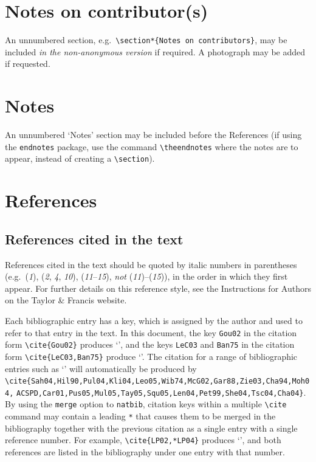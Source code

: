 \documentclass[]{interact}
\theoremstyle{plain}%
\theoremstyle{definition}
\theoremstyle{remark}
\begin{document}
\section*{Notes on contributor(s)}

An unnumbered section, e.g.\ \verb"\section*{Notes on contributors}", may be included \emph{in the non-anonymous version} if required. A photograph may be added if requested.


\section*{Notes}

An unnumbered `Notes' section may be included before the References (if using the \verb"endnotes" package, use the command \verb"\theendnotes" where the notes are to appear, instead of creating a \verb"\section").


\section{References}

\subsection{References cited in the text}

References cited in the text should be quoted by italic numbers in parentheses (e.g.\ (\textit{1}), (\textit{2}, \textit{4}, \textit{10}), (\textit{11}--\textit{15}), \emph{not} (\textit{11})--(\textit{15})), in the order in which they first appear. For further details on this reference style, see the Instructions for Authors on the Taylor \& Francis website.

Each bibliographic entry has a key, which is assigned by the author and used to refer to that entry in the text. In this document, the key \verb"Gou02" in the citation form \verb"\cite{Gou02}" produces `\cite{Gou02}', and the keys \verb"LeC03" and \verb"Ban75" in the citation form \verb"\cite{LeC03,Ban75}" produce `\cite{LeC03,Ban75}'. The citation for a range of bibliographic entries such as `\cite{Sah04,Hil90,Pul04,Kli04,Leo05,Wib74,McG02,Gar88,Zie03,Cha94,Moh04,ACSPD,Car01,Pus05,Mul05,Tay05,Squ05,Len04,Pet99,She04,Tsc04,Cha04}' will automatically be produced by \verb"\cite{Sah04,Hil90,Pul04,Kli04,Leo05,Wib74,McG02,Gar88,Zie03,Cha94,Moh04," \verb"ACSPD,Car01,Pus05,Mul05,Tay05,Squ05,Len04,Pet99,She04,Tsc04,Cha04}". By using the \verb"merge" option to \verb"natbib", citation keys within a multiple \verb"\cite" command may contain a leading \verb"*" that causes them to be merged in the bibliography together with the previous citation as a single entry with a single reference number. For example, \verb"\cite{LP02,*LP04}" produces `\cite{LP02,*LP04}', and both references are listed in the bibliography under one entry with that number.
\end{document}
